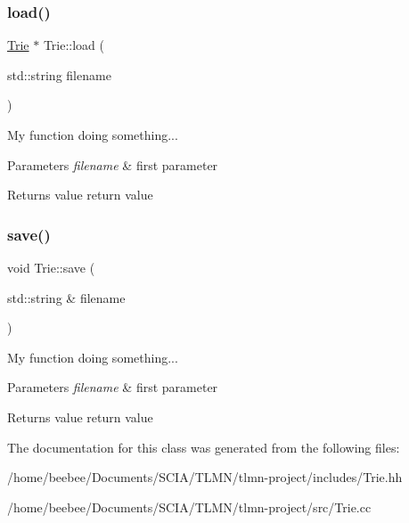 \subsubsection{\texorpdfstring{load()}{load()}}
{\footnotesize\ttfamily \hyperlink{classTrie}{Trie} $\ast$ Trie\+::load (\begin{DoxyParamCaption}\item[{std\+::string}]{filename }\end{DoxyParamCaption})\hspace{0.3cm}{\ttfamily [static]}}

My function doing something... 
\begin{DoxyParams}{Parameters}
{\em filename} & first parameter \\
\hline
\end{DoxyParams}
\begin{DoxyReturn}{Returns}
value return value 
\end{DoxyReturn}
\mbox{\label{classTrie_ab52d04199524ab434e1eb3df178c943e}} 
\subsubsection{\texorpdfstring{save()}{save()}}
{\footnotesize\ttfamily void Trie\+::save (\begin{DoxyParamCaption}\item[{std\+::string \&}]{filename }\end{DoxyParamCaption})}

My function doing something... 
\begin{DoxyParams}{Parameters}
{\em filename} & first parameter \\
\hline
\end{DoxyParams}
\begin{DoxyReturn}{Returns}
value return value 
\end{DoxyReturn}


The documentation for this class was generated from the following files\+:\begin{DoxyCompactItemize}
\item 
/home/beebee/\+Documents/\+S\+C\+I\+A/\+T\+L\+M\+N/tlmn-\/project/includes/Trie.\+hh\item 
/home/beebee/\+Documents/\+S\+C\+I\+A/\+T\+L\+M\+N/tlmn-\/project/src/Trie.\+cc\end{DoxyCompactItemize}
